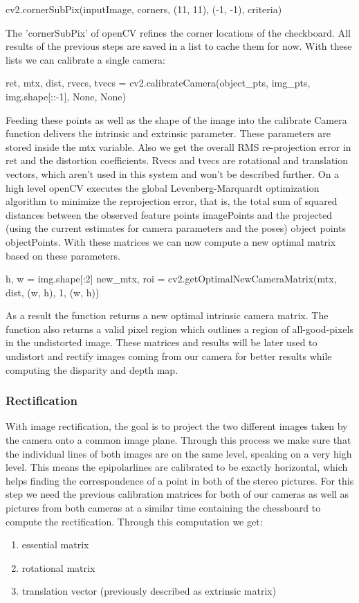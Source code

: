 \documentclass[journal,onecolumn]{IEEEtran}
\begin{document}
\begin{python}
cv2.cornerSubPix(inputImage,
		corners,
		(11, 11),
		(-1, -1),
		criteria)
\end{python}
The 'cornerSubPix' of openCV refines the corner locations \cite{forstner} of the checkboard.
All results of  the previous steps are saved in a list to cache them for now. With these lists we can calibrate a single camera:
\begin{python}
ret, mtx, dist, rvecs, tvecs = cv2.calibrateCamera(object_pts,
						   img_pts,
						   img.shape[::-1], None, None)
\end{python}
Feeding these points as well as the shape of the image into the calibrate Camera function delivers the intrinsic and extrinsic parameter.
These parameters are stored inside the mtx variable. Also we get the overall RMS re-projection error in ret and the distortion coefficients. Rvecs\cite{DBLP} and tvecs are rotational and translation vectors, which aren't used in this system and won't be described further.
On a high level openCV executes the global Levenberg-Marquardt optimization algorithm to minimize the reprojection error, that is, the total sum of squared distances between the observed feature points imagePoints and the projected (using the current estimates for camera parameters and the poses) object points objectPoints\cite{calibrateCamera}.
With these matrices we can now compute a new optimal matrix based on these parameters.
\begin{python}
h, w = img.shape[:2]
new_mtx, roi = cv2.getOptimalNewCameraMatrix(mtx,
				   	     dist,
				   	     (w, h), 1, (w, h))
\end{python}
As a result the function returns a new optimal intrinsic camera matrix. The function also returns a valid pixel region which outlines a region of all-good-pixels in the undistorted image. These matrices and results will be later used to undistort and rectify images coming from our camera for better results while computing the disparity and depth map.
\subsubsection{Rectification}
\noindent
With image rectification, the goal is to project the two different images taken by the camera onto a common image plane. Through this process we make sure that the individual lines of both images are on the same level, speaking on a very high level. This means the epipolarlines are calibrated to be exactly horizontal, which helps finding the correspondence of a point in both of the stereo pictures.
For this step we need the previous calibration matrices for both of our cameras as well as pictures from both cameras at a similar time containing the chessboard to compute the rectification. Through this computation we get:
\begin{enumerate}
	\item essential matrix
	\item rotational matrix
	\item translation vector (previously described as extrinsic matrix)
\end{enumerate}
\end{document}
